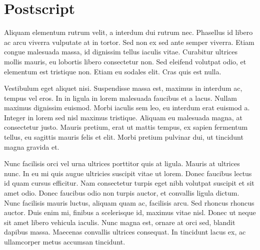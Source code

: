 \documentclass[12pt]{journalrebuttal}
\begin{document}
\makerule

\section*{Postscript}
Aliquam elementum rutrum velit, a interdum dui rutrum nec. Phasellus id libero ac arcu viverra vulputate at in tortor. Sed non ex sed ante semper viverra. Etiam congue malesuada massa, id dignissim tellus iaculis vitae. Curabitur ultrices mollis mauris, eu lobortis libero consectetur non. Sed eleifend volutpat odio, et elementum est tristique non. Etiam eu sodales elit. Cras quis est nulla.

Vestibulum eget aliquet nisi. Suspendisse massa est, maximus in interdum ac, tempus vel eros. In in ligula in lorem malesuada faucibus et a lacus. Nullam maximus dignissim euismod. Morbi iaculis sem leo, eu interdum erat euismod a. Integer in lorem sed nisl maximus tristique. Aliquam eu malesuada magna, at consectetur justo. Mauris pretium, erat ut mattis tempus, ex sapien fermentum tellus, eu sagittis mauris felis et elit. Morbi pretium pulvinar dui, ut tincidunt magna gravida et.

Nunc facilisis orci vel urna ultrices porttitor quis at ligula. Mauris at ultrices nunc. In eu mi quis augue ultricies suscipit vitae ut lorem. Donec faucibus lectus id quam cursus efficitur. Nam consectetur turpis eget nibh volutpat suscipit et sit amet odio. Donec faucibus odio non turpis auctor, et convallis ligula dictum. Nunc facilisis mauris luctus, aliquam quam ac, facilisis arcu. Sed rhoncus rhoncus auctor. Duis enim mi, finibus a scelerisque id, maximus vitae nisl. Donec ut neque sit amet libero vehicula iaculis. Nunc magna est, ornare at orci sed, blandit dapibus massa. Maecenas convallis ultrices consequat. In tincidunt lacus ex, ac ullamcorper metus accumsan tincidunt.
\end{document}
